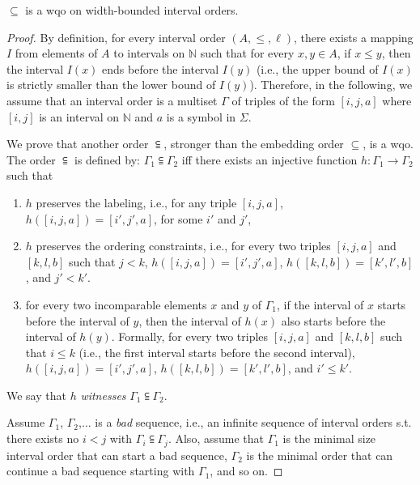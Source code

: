 \begin{lemma}
$\subseteq$ is a wqo on width-bounded interval orders.
\end{lemma}
\begin{proof}
By definition, for every interval order $(A,\leq,\ell)$, there exists a mapping $I$ from elements of $A$ to intervals on $\mathbb{N}$ such that for every $x,y\in A$, if $x\leq y$, then the interval $I(x)$ ends before the interval $I(y)$ (i.e., the upper bound of $I(x)$ is strictly smaller than the lower bound of $I(y)$). %
Therefore, in the following, we assume that an interval order is a multiset $\Gamma$ of triples of the form $[i,j,a]$ where $[i,j]$ is an interval on $\mathbb{N}$ and $a$ is a symbol in $\Sigma$.

We prove that another order $\subseteqq$, stronger than the embedding order $\subseteq$, is a wqo. The order $\subseteqq$ is defined by: $\Gamma_1\subseteqq \Gamma_2$ iff there exists an injective function $h:\Gamma_1\rightarrow \Gamma_2$ such that
\begin{enumerate}
	\item $h$ preserves the labeling, i.e., for any triple $[i,j,a]$, $h([i,j,a])=[i',j',a]$, for some $i'$ and $j'$,
	\item $h$ preserves the ordering constraints, i.e., for every two triples $[i,j,a]$ and $[k,l,b]$ such that $j< k$, $h([i,j,a])=[i',j',a]$, $h([k,l,b])=[k',l',b]$, and $j'< k'$.
	\item for every two incomparable elements $x$ and $y$ of $\Gamma_1$, if the interval of $x$ starts before the interval of $y$, then the interval of $h(x)$ also starts before the interval of $h(y)$. Formally, for every two triples $[i,j,a]$ and $[k,l,b]$ such that $i\leq k$ (i.e., the first interval starts before the second interval), $h([i,j,a])=[i',j',a]$, $h([k,l,b])=[k',l',b]$, and $i'\leq k'$.
\end{enumerate}
We say that $h$ \emph{witnesses} $\Gamma_1\subseteqq \Gamma_2$.

Assume $\Gamma_1$, $\Gamma_2$,$\ldots$ is a \emph{bad} sequence, i.e., an infinite sequence of interval orders s.t. there exists no $i < j$ with $\Gamma_i\subseteqq \Gamma_j$. Also, assume that $\Gamma_1$ is the minimal size interval order that can start a bad sequence, $\Gamma_2$ is the minimal order that can continue a bad sequence starting with $\Gamma_1$, and so on.


\end{proof}
